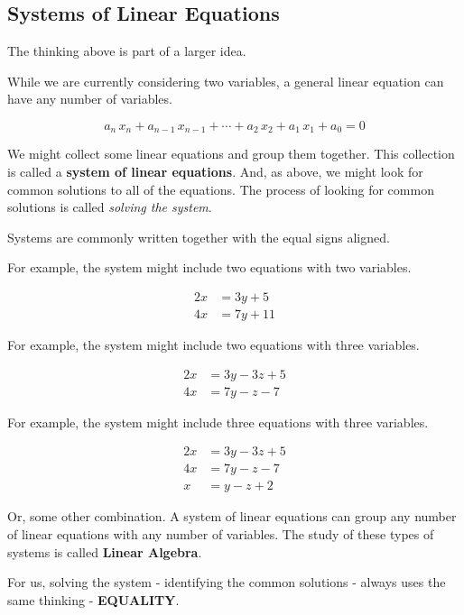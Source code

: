 \documentclass{ximera}
\begin{document}
\subsection*{Systems of Linear Equations}

The thinking above is part of a larger idea.


While we are currently considering two variables, a general linear equation can have any number of variables.


\[
a_n \, x_n + a_{n-1} \, x_{n-1} + \cdots + a_2 \, x_2 + a_1 \, x_1 + a_0 = 0
\]


We might collect some linear equations and group them together. This collection is called a \textbf{system of linear equations}. And, as above, we might look for common solutions to all of the equations.  The process of looking for common solutions is called \textit{solving the system}.





Systems are commonly written together with the equal signs aligned.

For example, the system might include two equations with two variables.

\begin{align*}
2x & = 3y + 5 \\
4x & = 7y + 11
\end{align*}



For example, the system might include two equations with three variables.

\begin{align*}
2x & = 3y - 3z + 5 \\
4x & = 7y - z - 7
\end{align*}




For example, the system might include three equations with three variables.

\begin{align*}
2x & = 3y - 3z + 5 \\
4x & = 7y - z - 7 \\
x & = y - z + 2 
\end{align*}


Or, some other combination. A system of linear equations can group any number of linear equations with any number of variables.  The study of these types of systems is called \textbf{Linear Algebra}.

For us, solving the system - identifying the common solutions - always uses the same thinking - \textbf{\textcolor{purple!85!blue}{EQUALITY}}.
\end{document}
